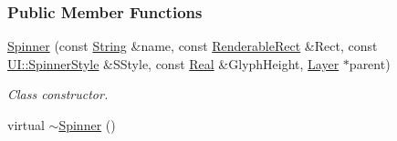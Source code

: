 \subsubsection*{Public Member Functions}
\begin{DoxyCompactItemize}
\item 
\hyperlink{classMezzanine_1_1UI_1_1Spinner_ad8f08046b19ec7f82137984eed5e9597}{Spinner} (const \hyperlink{namespaceMezzanine_acf9fcc130e6ebf08e3d8491aebcf1c86}{String} \&name, const \hyperlink{structMezzanine_1_1UI_1_1RenderableRect}{RenderableRect} \&Rect, const \hyperlink{namespaceMezzanine_1_1UI_a62462d4df783dcdda77e1590a96bc6d6}{UI::SpinnerStyle} \&SStyle, const \hyperlink{namespaceMezzanine_a726731b1a7df72bf3583e4a97282c6f6}{Real} \&GlyphHeight, \hyperlink{classMezzanine_1_1UI_1_1Layer}{Layer} $\ast$parent)
\begin{DoxyCompactList}\small\item\em Class constructor. \item\end{DoxyCompactList}\item 
\hypertarget{classMezzanine_1_1UI_1_1Spinner_ae76d246ca5c7e8e5166e1149caaf55fc}{
virtual \hyperlink{classMezzanine_1_1UI_1_1Spinner_ae76d246ca5c7e8e5166e1149caaf55fc}{$\sim$Spinner} ()}
\label{classMezzanine_1_1UI_1_1Spinner_ae76d246ca5c7e8e5166e1149caaf55fc}


\end{DoxyCompactItemize}
